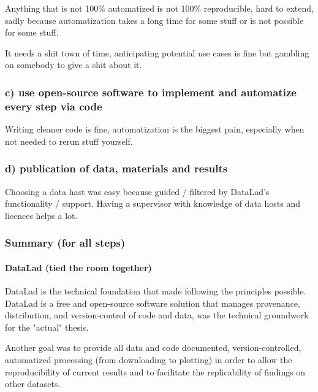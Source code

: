 %
Anything that is not 100\% automatized is not 100\% reproducible, hard to
extend, sadly because automatization takes a long time for some stuff or is not
possible for some stuff.

%
It needs a shit town of time, anticipating potential use cases is fine but
gambling on somebody to give a shit about it.



\subsubsection{c) use open-source software to implement and automatize every
step via code}


Writing cleaner code is fine, automatization is the biggest pain, especially
when not needed to rerun stuff yourself.


\subsubsection{d) publication of data, materials and results}




%
Choosing a data hast was easy because guided / filtered by DataLad's
functionality / support.
%
Having a supervisor with knowledge of data hosts and licences helps a lot.



\subsubsection{Summary (for all steps)}

\paragraph{DataLad (tied the room together)}
%
DataLad \citet{halchenko2021datalad} is the technical foundation that made
following the principles possible.
%
DataLad is a free and open-source software solution
that manages provenance, distribution, and version-control of code and data,
was the technical groundwork for the "actual" thesis.

%
Another goal was to provide all data and code documented, version-controlled,
automatized processing (from downloading to plotting) in order to allow the
reproducibility of current results and to facilitate the replicability of
findings on other datasets.

